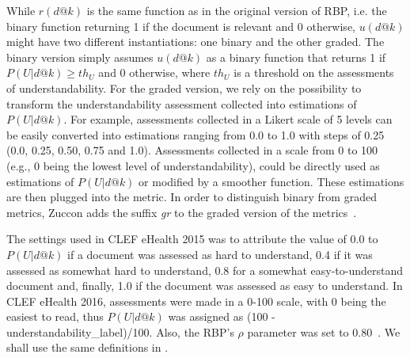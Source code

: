 While $r(d@k)$ is the same function as in the original version of RBP, i.e. the binary function returning 1 if the document is relevant and 0 otherwise, $u(d@k)$ might have two different instantiations: one binary and the other graded. The binary version simply assumes $u(d@k)$ as a binary function that returns 1 if $P(U|d@k) \geq th_U$ and 0 otherwise, where $th_U$ is a threshold on the assessments of understandability. 
For the graded version, we rely on the possibility to transform the understandability assessment collected into estimations of $P(U|d@k)$.
For example, assessments collected in a Likert scale of 5 levels can be easily converted into estimations ranging from 0.0 to 1.0 with steps of 0.25 (0.0, 0.25, 0.50, 0.75 and 1.0).
Assessments collected in a scale from 0 to 100 (e.g., 0 being the lowest level of understandability), could be directly used as estimations of $P(U|d@k)$ or modified by a smoother function.
These estimations are then plugged into the metric. In order to distinguish binary from graded metrics, Zuccon adds the suffix \textit{gr} to the graded version of the metrics~\cite{zuccon16}.

The settings used in CLEF eHealth 2015 was to attribute the value of 0.0 to $P(U|d@k)$ if a document was assessed as hard to understand, 0.4 if it was assessed as somewhat hard to understand, 0.8 for a somewhat easy-to-understand document and, finally, 1.0 if the document was assessed as easy to understand. In CLEF eHealth 2016, assessments were made in a 0-100 scale, with 0 being the easiest to read, thus $P(U|d@k)$ was assigned as (100 - understandability\_label)/100.
Also, the RBP's $\rho$ parameter was set to 0.80~\cite{clef15,clef16}. We shall use the same definitions in .


